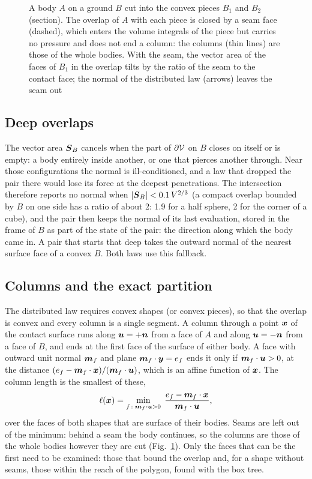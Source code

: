 \begin{figure}[!htbp]
\centering

\caption{A body $A$ on a ground $B$ cut into the convex pieces $B_1$ and $B_2$ (section). The
overlap of $A$ with each piece is closed by a seam face (dashed), which enters the volume
integrals of the piece but carries no pressure and does not end a column: the columns (thin
lines) are those of the whole bodies. With the seam, the vector area of the faces of $B_1$ in
the overlap tilts by the ratio of the seam to the contact face; the normal of the distributed
law (arrows) leaves the seam out}
\label{fig:seams}
\end{figure}

\subsection{Deep overlaps}

The vector area $\boldsymbol{S}_B$ cancels when the part of $\partial\mathcal{V}$ on $B$ closes on itself
or is empty: a body entirely inside another, or one that pierces another through. Near those
configurations the normal is ill-conditioned, and a law that dropped the pair there would lose
its force at the deepest penetrations. The intersection therefore reports no normal when
$|\boldsymbol{S}_B| < 0.1\, V^{2/3}$ (a compact overlap bounded by $B$ on one side has a ratio of
about 2: 1.9 for a half sphere, 2 for the corner of a cube), and the pair then keeps the normal
of its last evaluation, stored in the frame of $B$ as part of the state of the pair: the
direction along which the body came in. A pair that starts that deep takes the outward normal
of the nearest surface face of a convex $B$. Both laws use this fallback.

\subsection{Columns and the exact partition}\label{sup:columns}

The distributed law requires convex shapes (or convex pieces), so that the overlap is convex
and every column is a single segment. A column through a point $\boldsymbol{x}$ of the contact surface runs
along $\boldsymbol{u} = +\boldsymbol{n}$ from a face of $A$ and along $\boldsymbol{u} = -\boldsymbol{n}$ from a face of $B$, and
ends at the first face of the surface of either body. A face with outward unit normal $\boldsymbol{m}_f$
and plane $\boldsymbol{m}_f\cdot\boldsymbol{y} = e_f$ ends it only if $\boldsymbol{m}_f\cdot\boldsymbol{u} > 0$, at the distance
$(e_f - \boldsymbol{m}_f\cdot\boldsymbol{x})/(\boldsymbol{m}_f\cdot\boldsymbol{u})$, which is an affine function of $\boldsymbol{x}$. The column
length is the smallest of these,
\begin{equation}
  \ell(\boldsymbol{x}) = \min_{f\,:\;\boldsymbol{m}_f\cdot\boldsymbol{u} > 0}\; \frac{e_f - \boldsymbol{m}_f\cdot\boldsymbol{x}}{\boldsymbol{m}_f\cdot\boldsymbol{u}} ,
  \label{eq:column}
\end{equation}
over the faces of both shapes that are surface of their bodies. Seams are left out of the
minimum: behind a seam the body continues, so the columns are those of the whole bodies however
they are cut (Fig.~\ref{fig:seams}). Only the faces that can be the first need to be examined:
those that bound the overlap and, for a shape without seams, those within the reach of the
polygon, found with the box tree.

